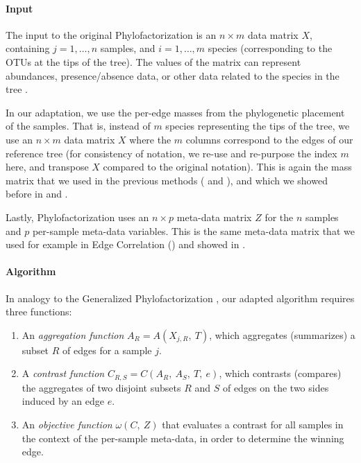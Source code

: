 \paragraph{Input}
\label{sec:Factorization:sub:Methods:sub:Phylofactor:par:Input}

The input to the original Phylofactorization is an $n \times m$ data matrix $X$,
containing $j = 1, \ldots, n$ samples, and $i = 1, \ldots, m$ species (corresponding to the OTUs at the tips of the tree).
The values of the matrix can represent abundances, presence/absence data, 
or other data related to the species in the tree \cite{Washburne2019}.

In our adaptation, we use the per-edge masses from the phylogenetic placement of the samples.
That is, instead of $m$ species representing the tips of the tree,
we use an $n \times m$ data matrix $X$ where the $m$ columns correspond to the edges of our reference tree
(for consistency of notation, we re-use and re-purpose the index $m$ here,
and transpose $X$ compared to the original notation).
This is again the mass matrix that we used in the previous methods ( and ),
and which we showed before in  and .

Lastly, Phylofactorization uses an $n \times p$ meta-data matrix $Z$ for the $n$ samples
and $p$ per-sample meta-data variables.
This is the same meta-data matrix that we used for example in Edge Correlation
() and showed in .


\paragraph{Algorithm}
\label{sec:Factorization:sub:Methods:sub:Phylofactor:par:Algorithm}

In analogy to the Generalized Phylofactorization \cite{Washburne2018,Washburne2019},
our adapted algorithm requires three functions:

\begin{enumerate}
    \item An \emph{aggregation function} $A_R = A( X_{j,R}, ~T )$,
          which aggregates (summarizes) a subset $R$ of edges for a sample $j$.
    \item A \emph{contrast function} $C_{R,S} = C( A_R, ~A_S, ~T, ~e )$, which contrasts (compares)
          the aggregates of two disjoint subsets $R$ and $S$ of edges on the two sides induced by an edge $e$.
    \item An \emph{objective function} $\omega(C, ~Z)$ that evaluates a contrast for all samples
          in the context of the per-sample meta-data, in order to determine the winning edge.
\end{enumerate}

